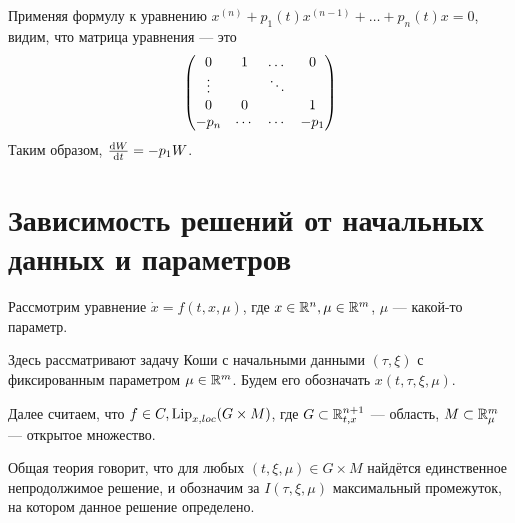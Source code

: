 \documentclass[a4paper]{report}
\begin{document}
    Применяя формулу к уравнению $x^{(n)} + p_1(t)x^{(n - 1)} + \dots + p_n(t)x = 0$, видим, что матрица уравнения --- это
    \[\begin{pmatrix}0 & 1 & \dots & 0 \\\vdots && \ddots & \\0 &0&&1 \\ -p_n &\cdots &\cdots & -p_1 \end{pmatrix}\]
    Таким образом, $\frac{\operatorname{d}\! W}{\operatorname{d}\! t} = -p_1 W$.


    \chapter{Зависимость решений от начальных данных и параметров}
    Рассмотрим уравнение $\dot{x} = f(t, x, \mu)$, где $x \in \mathbb{R}^n, \mu \in \mathbb{R}^m$, $\mu$ --- какой-то параметр.

    Здесь рассматривают задачу Коши с начальными данными $(\tau, \xi)$ с фиксированным параметром $\mu \in \mathbb{R}^m$.
    Будем его обозначать $x(t, \tau, \xi, \mu)$.

    Далее считаем, что $f \in C, \operatorname{Lip}_{x,loc}(G \times M)$, где $G \subset \mathbb{R}_{t,x}^{n + 1}$ --- область, $M \subset \mathbb{R}_{\mu}^{m}$ --- открытое множество.

    Общая теория говорит, что для любых $(t, \xi, \mu) \in G \times M$ найдётся единственное непродолжимое решение, и обозначим за $I(\tau, \xi, \mu)$ максимальный промежуток, на котором данное решение определено.
\end{document}
